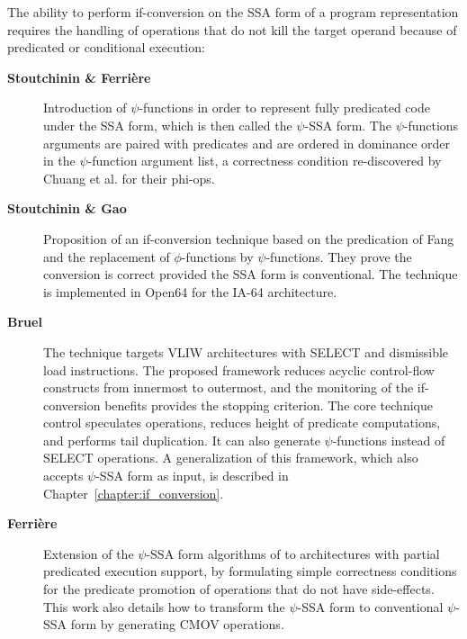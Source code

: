 The ability to perform if-conversion on the SSA form of a program representation
requires the handling of operations that do not kill the target operand because
of predicated or conditional execution: \begin{description}

\item[\textbf{Stoutchinin \& Ferri\`ere \cite{Stoutchinin:2001:MICRO}}] Introduction of
$\psi$-functions in order to represent fully predicated code under the SSA form,
which is then called the $\psi$-SSA form.  The $\psi$-functions arguments are
paired with predicates and are ordered in dominance order in the $\psi$-function
argument list, a correctness condition re-discovered by Chuang et al.
\cite{Chuang:2003:CGO} for their phi-ops.

\item[\textbf{Stoutchinin \& Gao \cite{Stoutchinin:2004:EuroPar}}] Proposition of an
if-conversion technique based on the predication of Fang \cite{Fang:1996:LCPC}
and the replacement of $\phi$-functions by $\psi$-functions. They prove the
conversion is correct provided the SSA form is conventional. The technique is
implemented in Open64 for the IA-64 architecture.

\item[\textbf{Bruel \cite{Bruel:2006:ODES}}] The technique targets VLIW architectures with SELECT and
dismissible load instructions. The proposed framework reduces acyclic
control-flow constructs from innermost to outermost, and the monitoring of the
if-conversion benefits provides the stopping criterion. The core technique
control speculates operations, reduces height of predicate computations, and
performs tail duplication. It can also generate $\psi$-functions instead of
SELECT operations. A generalization of this framework, which also accepts
$\psi$-SSA form as input, is described in Chapter~\ref{chapter:if_conversion}.

\item[\textbf{Ferri\`ere \cite{Ferriere:2007:SCOPES}}] Extension of the $\psi$-SSA form
algorithms of \cite{Stoutchinin:2001:MICRO} to architectures with partial
predicated execution support, by formulating simple correctness conditions for
the predicate promotion of operations that do not have side-effects. This work
also details how to transform the $\psi$-SSA form to conventional $\psi$-SSA
form by generating CMOV operations.

\end{description}

